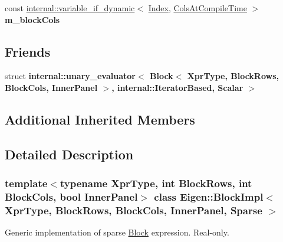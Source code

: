 \begin{DoxyCompactItemize}
\item 
\mbox{\label{class_eigen_1_1_block_impl_3_01_xpr_type_00_01_block_rows_00_01_block_cols_00_01_inner_panel_00_01_sparse_01_4_a2da4d27fe5bef724630c4b4af8f0ddec}} 
const \hyperlink{class_eigen_1_1internal_1_1variable__if__dynamic}{internal\+::variable\+\_\+if\+\_\+dynamic}$<$ \hyperlink{group___core___module_a554f30542cc2316add4b1ea0a492ff02}{Index}, \hyperlink{group___sparse_core___module_a726a12d2ba40a5f476c247c8f6db39d9abde032f883577b8aaad1c2a29ac3f18c}{Cols\+At\+Compile\+Time} $>$ {\bfseries m\+\_\+block\+Cols}
\end{DoxyCompactItemize}
\subsection*{Friends}
\begin{DoxyCompactItemize}
\item 
\mbox{\label{class_eigen_1_1_block_impl_3_01_xpr_type_00_01_block_rows_00_01_block_cols_00_01_inner_panel_00_01_sparse_01_4_abbd5998ae9e753ee48f1d0540f134ba7}} 
struct {\bfseries internal\+::unary\+\_\+evaluator$<$ Block$<$ Xpr\+Type, Block\+Rows, Block\+Cols, Inner\+Panel $>$, internal\+::\+Iterator\+Based, Scalar $>$}
\end{DoxyCompactItemize}
\subsection*{Additional Inherited Members}


\subsection{Detailed Description}
\subsubsection*{template$<$typename Xpr\+Type, int Block\+Rows, int Block\+Cols, bool Inner\+Panel$>$\newline
class Eigen\+::\+Block\+Impl$<$ Xpr\+Type, Block\+Rows, Block\+Cols, Inner\+Panel, Sparse $>$}

Generic implementation of sparse \hyperlink{group___core___module_class_eigen_1_1_block}{Block} expression. Real-\/only. 


